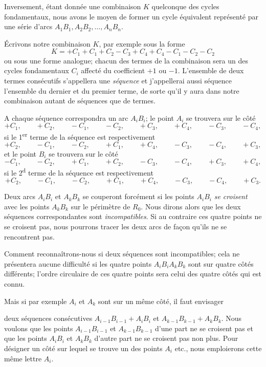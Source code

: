 \documentclass{article}
\begin{document}
Inversement, étant donnée une combinaison $K$ quelconque des cycles fondamentaux, nous avons le moyen de former un cycle équivalent représenté par une série d'arcs $A_{1}B_{1}, A_{2}B_{2}, \ldots, A_{n}B_{n}$.

Écrivons notre combinaison $K$, par exemple sous la forme
\[ K = +C_{1} + C_{1} + C_{2} - C_{3} + C_{4} + C_{4} - C_{1} - C_{2} - C_{2} \]
ou sous une forme analogue; chacun des termes de la combinaison sera un des cycles fondamentaux $C_{i}$ affecté du coefficient $+1$ ou $-1$. L'ensemble de deux termes consécutifs s'appellera une \emph{séquence} et j'appellerai aussi séquence l'ensemble du dernier et du premier terme, de sorte qu'il y aura dans notre combinaison autant de séquences que de termes.

A chaque séquence correspondra un arc $A_{i}B_{i}$; le point $A_{i}$ se trouvera sur le côté
\[ +C_{1}, \qquad +C_{2}, \qquad -C_{1}, \qquad -C_{2}, \qquad +C_{3}, \qquad +C_{4}, \qquad -C_{3}, \qquad -C_{4}, \]
si le 1\textsuperscript{er} terme de la séquence est respectivement
\[ +C_{2}, \qquad -C_{1}, \qquad -C_{2}, \qquad +C_{1}, \qquad +C_{4}, \qquad -C_{3}, \qquad -C_{4}, \qquad +C_{3}, \]
et le point $B_{i}$ se trouvera sur le côté
\[ -C_{1}, \qquad -C_{2}, \qquad +C_{1}, \qquad +C_{2}, \qquad -C_{3}, \qquad -C_{4}, \qquad +C_{3}, \qquad +C_{4}, \]
si le 2\textsuperscript{d} terme de la séquence est respectivement
\[ +C_{2}, \qquad -C_{1}, \qquad -C_{2}, \qquad +C_{1}, \qquad +C_{4}, \qquad -C_{3}, \qquad -C_{4}, \qquad +C_{3}. \]

Deux arcs $A_{i}B_{i}$ et $A_{k}B_{k}$ se couperont forcément si les points $A_{i}B_{i}$ \emph{se croisent} avec les points $A_{k}B_{k}$ sur le périmètre de $R_{0}$. Nous dirons alors que les deux séquences correspondantes sont \emph{incompatibles}. Si au contraire ces quatre points ne se croisent pas, nous pourrons tracer les deux arcs de façon qu'ils ne se rencontrent pas.

Comment reconnaîtrons-nous si deux séquences sont incompatibles; cela ne présentera aucune difficulté si les quatre points $A_{i}B_{i}A_{k}B_{k}$ sont sur quatre côtés différents; l'ordre circulaire de ces quatre points sera celui des quatre côtés qui est connu.

Mais si par exemple $A_{i}$ et $A_{k}$ sont sur un même côté, il faut envisager

deux séquences consécutives $A_{i-1}B_{i-1} + A_{i}B_{i}$ et $A_{k-1}B_{k-1} + A_{k}B_{k}$. Nous voulons que les points $A_{i-1}B_{i-1}$ et $A_{k-1}B_{k-1}$ d'une part ne se croisent pas et que les points $A_{i}B_{i}$ et $A_{k}B_{k}$ d'autre part ne se croisent pas non plus. Pour désigner un côté sur lequel se trouve un des points $A_{i}$ etc., nous emploierons cette même lettre $A_{i}$.
\end{document}
